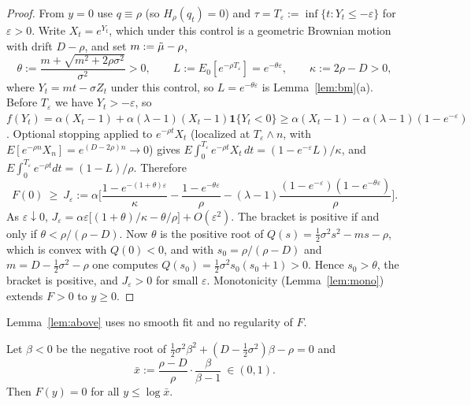 \begin{proof}
From $y=0$ use $q\equiv\rho$ (so $H_\rho(q_t)=0$) and $\tau=T_\varepsilon:=\inf\{t:Y_t\le-\varepsilon\}$ for $\varepsilon>0$. Write $X_t=e^{Y_t}$, which under this control is a geometric Brownian motion with drift $D-\rho$, and set $m:=\tilde\mu-\rho$,
\[
\theta:=\frac{m+\sqrt{m^2+2\rho\sigma^2}}{\sigma^2}>0,\qquad L:=E_0[e^{-\rho T_\varepsilon}]=e^{-\theta\varepsilon},\qquad \kappa:=2\rho-D>0 ,
\]
where $Y_t=mt-\sigma Z_t$ under this control, so $L=e^{-\theta\varepsilon}$ is Lemma~\ref{lem:bm}(a).
Before $T_\varepsilon$ we have $Y_t>-\varepsilon$, so $f(Y_t)=\alpha(X_t-1)+\alpha(\lambda-1)(X_t-1)\mathbf 1\{Y_t<0\}\ge\alpha(X_t-1)-\alpha(\lambda-1)(1-e^{-\varepsilon})$. Optional stopping applied to $e^{-\rho t}X_t$ (localized at $T_\varepsilon\wedge n$, with $E[e^{-\rho n}X_n]=e^{(D-2\rho)n}\to0$) gives $E\int_0^{T_\varepsilon}e^{-\rho t}X_t\,dt=(1-e^{-\varepsilon}L)/\kappa$, and $E\int_0^{T_\varepsilon}e^{-\rho t}dt=(1-L)/\rho$. Therefore
\begin{equation}
F(0)\ \ge\ J_\varepsilon:=\alpha\Big[\frac{1-e^{-(1+\theta)\varepsilon}}{\kappa}-\frac{1-e^{-\theta\varepsilon}}{\rho}-(\lambda-1)\frac{(1-e^{-\varepsilon})(1-e^{-\theta\varepsilon})}{\rho}\Big]. \label{eq:Jeps}
\end{equation}
As $\varepsilon\downarrow0$, $J_\varepsilon=\alpha\varepsilon\big[(1+\theta)/\kappa-\theta/\rho\big]+O(\varepsilon^2)$. The bracket is positive if and only if $\theta<\rho/(\rho-D)$. Now $\theta$ is the positive root of $Q(s)=\tfrac12\sigma^2s^2-ms-\rho$, which is convex with $Q(0)<0$, and with $s_0=\rho/(\rho-D)$ and $m=D-\tfrac12\sigma^2-\rho$ one computes $Q(s_0)=\tfrac12\sigma^2 s_0(s_0+1)>0$. Hence $s_0>\theta$, the bracket is positive, and $J_\varepsilon>0$ for small $\varepsilon$. Monotonicity (Lemma~\ref{lem:mono}) extends $F>0$ to $y\ge0$.
\end{proof}

\begin{aremark}
Lemma~\ref{lem:above} uses no smooth fit and no regularity of $F$.
\end{aremark}

\begin{alemma}\label{lem:below}
Let $\beta<0$ be the negative root of $\tfrac12\sigma^2\beta^2+(D-\tfrac12\sigma^2)\beta-\rho=0$ and
\[
\bar x:=\frac{\rho-D}{\rho}\cdot\frac{\beta}{\beta-1}\ \in(0,1).
\]
Then $F(y)=0$ for all $y\le\log\bar x$.
\end{alemma}

